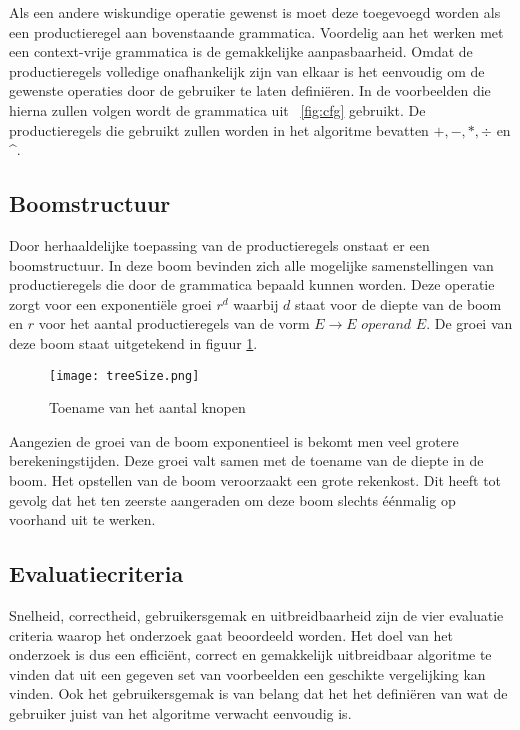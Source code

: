 \documentclass[Main.tex]{subfiles}
\begin{document}
Als een andere wiskundige operatie gewenst is moet deze toegevoegd worden als een productieregel aan bovenstaande grammatica. Voordelig aan het werken met een context-vrije grammatica is de gemakkelijke aanpasbaarheid. Omdat de productieregels volledige onafhankelijk zijn van elkaar is het eenvoudig om de gewenste operaties door de gebruiker te laten defini\"eren. In de voorbeelden die hierna zullen volgen wordt de grammatica uit ~\ref{fig:cfg} gebruikt. De productieregels die gebruikt zullen worden in het algoritme bevatten $+, -, \ast, \div$ en \^{}.

\subsection{Boomstructuur}

Door herhaaldelijke toepassing van de productieregels onstaat er een boomstructuur. In deze boom bevinden zich alle mogelijke samenstellingen van productieregels die door de grammatica bepaald kunnen worden. Deze operatie zorgt voor een exponenti\"ele groei $r^{d}$ waarbij $d$ staat voor de diepte van de boom en $r$ voor het aantal productieregels van de vorm $E \rightarrow E$  $operand$ $ E$. De groei van deze boom staat uitgetekend in figuur \ref{fig:treeSize}.

\begin{figure}[!htb]
\centering
\texttt{[image: treeSize.png]}
\caption{Toename van het aantal knopen}
\label{fig:treeSize}
\end{figure}
Aangezien de groei van de boom exponentieel is bekomt men veel grotere berekeningstijden. Deze groei valt samen met de toename van de diepte in de boom. Het opstellen van de boom veroorzaakt een grote rekenkost. Dit heeft tot gevolg dat het ten zeerste aangeraden om deze boom slechts \'e\'enmalig op voorhand uit te werken.

\subsection{Evaluatiecriteria}

Snelheid, correctheid, gebruikersgemak en uitbreidbaarheid zijn de vier evaluatie criteria waarop het onderzoek gaat beoordeeld worden. Het doel van het onderzoek is dus een effici\"ent, correct en gemakkelijk uitbreidbaar algoritme te vinden dat uit een gegeven set van voorbeelden een geschikte vergelijking kan vinden. Ook het gebruikersgemak is van belang dat het het defini\"eren van wat de gebruiker juist van het algoritme verwacht eenvoudig is.
\end{document}
